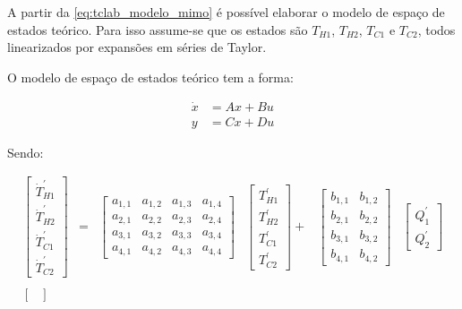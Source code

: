 A partir da \cref{eq:tclab_modelo_mimo} é possível elaborar o modelo de espaço de estados teórico.
Para isso assume-se que os estados são $T_{H1}$, $T_{H2}$, $T_{C1}$ e $T_{C2}$, todos linearizados
por expansões em séries de Taylor.

O modelo de espaço de estados teórico tem a forma:

\begin{equation*}
	\begin{aligned}
		\dot{x} &= Ax + Bu		\\
		y &= Cx + Du
	\end{aligned}
\end{equation*}	

\noindent
Sendo:

\begin{equation}
	\begin{aligned}
		\begin{bmatrix}
			\dot{T}_{H1}^{'}	\\
			\dot{T}_{H2}^{'}	\\
			\dot{T}_{C1}^{'}	\\
			\dot{T}_{C2}^{'}
		\end{bmatrix}
		&=&
		\begin{bmatrix}
			a_{1,1}		&		a_{1,2}		&		a_{1,3}		&		a_{1,4}		\\
			a_{2,1}		&		a_{2,2}		&		a_{2,3}		&		a_{2,4}		\\
			a_{3,1}		&		a_{3,2}		&		a_{3,3}		&		a_{3,4}		\\
			a_{4,1}		&		a_{4,2}		&		a_{4,3}		&		a_{4,4}	
		\end{bmatrix}
		&
		\begin{bmatrix}
			T_{H1}^{'}	\\
			T_{H2}^{'}	\\
			T_{C1}^{'}	\\
			T_{C2}^{'}
		\end{bmatrix}
		+&
		\begin{bmatrix}
			b_{1,1}		&		b_{1,2}		\\
			b_{2,1}		&		b_{2,2}		\\
			b_{3,1}		&		b_{3,2}		\\
			b_{4,1}		&		b_{4,2}	
		\end{bmatrix}
		&
		\begin{bmatrix}
			Q_{1}^{'}		\\
			Q_{2}^{'}
		\end{bmatrix}
		\\
		\\
		\begin{bmatrix}

\end{bmatrix}
\end{aligned}
\end{equation}
